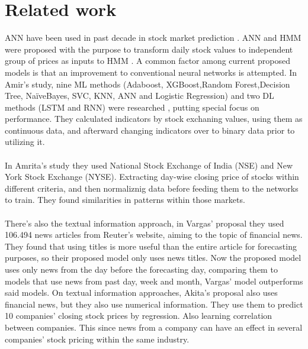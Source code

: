 \documentclass[conference]{IEEEtran}
\begin{document}
\section{Related work}
ANN have been used in past decade in stock market prediction \cite{M2018}. ANN and HMM were proposed with the purpose to transform daily
stock values to independent group of prices as inputs to HMM \cite{nabipour2020predicting}. A common factor among current proposed models is that
an improvement to conventional neural networks is attempted. In Amir's study, nine ML methods (Adaboost, XGBoost,Random Forest,Decision Tree, NaïveBayes, SVC, KNN, ANN and Logistic Regression)
and two DL methods  (LSTM and RNN) were researched \cite{nabipour2020predicting} , putting special focus on performance.
They calculated indicators by stock exchaning values, using them as continuous data, and afterward changing indicators over to binary data prior to utilizing it. 
\\\\
In Amrita's study they used National Stock Exchange of India (NSE) and New York Stock Exchange (NYSE). Extracting day-wise closing price of stocks within different criteria, and then normaliznig data before feeding them to the
networks to train. They found similarities in patterns within those markets.
\\\\
There's also the textual information approach, in Vargas' proposal \cite{Vargas2017} they used 106.494 news articles
from Reuter's website, aiming to the topic of financial news. They found that using titles is more useful than the entire article for forecasting purposes,
so their proposed model only uses news titles. Now the proposed model uses only news from the day before the forecasting day, comparing them to models that use news from past day, week and month,
Vargas' model outperforms said models. On textual information approaches, Akita's proposal \cite{Akita2016} also uses financial news, but they also use numerical information. They use them to predict 10 companies' closing stock prices by regression.
Also learning correlation between companies. This since news from a company can have an effect in several companies' stock pricing within the same industry. 
\end{document}
